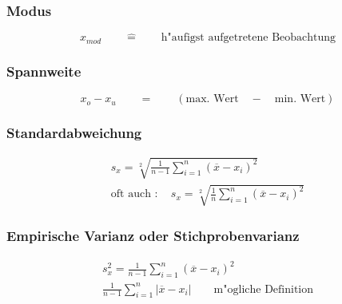 \subsubsection{Modus}
\begin{equation}
	x_{mod} \qquad\hat{=}\qquad\text{h"aufigst aufgetretene Beobachtung}
\end{equation}

\subsubsection{Spannweite}
\begin{equation}
	x_o-x_u \qquad=\qquad \left(\text{max. Wert}\quad-\quad\text{min. Wert}\right)
\end{equation}

\subsubsection{Standardabweichung}
\begin{gather}
	s_x = \sqrt[2]{\frac{1}{n-1}\sum_{i=1}^n(\overline{x}-x_i)^2} \\
	\text{oft auch }:\quad s_x=\sqrt[2]{\frac{1}{n}\sum_{i=1}^n(\overline{x}-x_i)^2}
\end{gather}

\subsubsection{Empirische Varianz oder Stichprobenvarianz}
\begin{gather}
	s_x^2 = \frac{1}{n-1}\sum_{i=1}^n(\overline{x}-x_i)^2 \\
	\frac{1}{n-1}\sum_{i=1}^n|\overline{x}-x_i|\qquad\text{m"ogliche Definition}
\end{gather}

